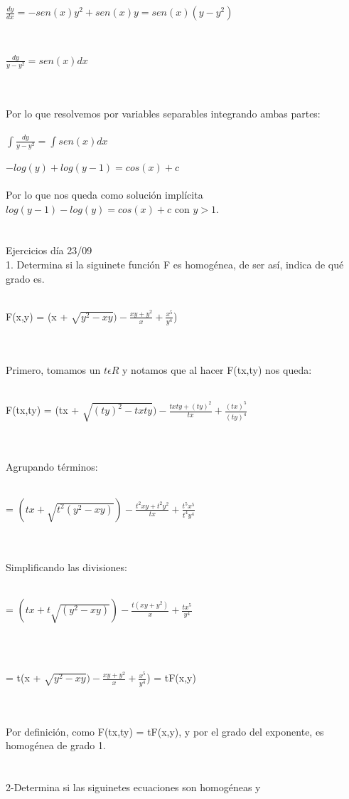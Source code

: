 \documentclass[a4paper,10pt]{article}
\begin{document}
\centerline{$\frac{dy}{dx} = -sen(x)y^2 + sen(x)y = sen(x)(y-y^2)$}\\
\centerline{$\frac{dy}{y-y^2}= sen(x) dx$}\\\\
Por lo que resolvemos por variables separables integrando ambas partes:\\\\
$\int \frac{dy}{y-y^2}= \int sen(x) dx$\\\\
$-log(y) + log(y-1) = cos(x) + c $\\\\
Por lo que nos queda como solución implícita $log(y-1)-log(y)   = cos(x) + c $ con $y>1$.\\\\\\
Ejercicios día 23/09 \\
1. Determina si la siguinete función F es homogénea, de ser así,
indica de qué grado es.\\\\
\centerline{ F(x,y) = (x + $\sqrt{y^2 - xy}) - \frac{xy + y^2 }{x} + \frac{x^5}{y^4}$)}\\\\
Primero, tomamos un $t\epsilon R$ y notamos que al hacer F(tx,ty) nos queda:\\\\
\centerline{ F(tx,ty) = (tx + $\sqrt{(ty)^2 - txty}) - \frac{txty + (ty)^2 }{tx} + \frac{(tx)^5}{(ty)^4}$}\\\\
Agrupando términos:\\\\
\centerline{ = $(tx + \sqrt{t^2(y^2 - xy)}) - \frac{t^2xy + t^2y^2 }{tx} + \frac{t^5x^5}{t^4y^4}$}\\\\
Simplificando las divisiones:\\\\
\centerline{= $(tx + t\sqrt{(y^2 - xy)}) - \frac{t(xy + y^2) }{x} + \frac{tx^5}{y^4}$}\\\\
\centerline{ = t(x + $\sqrt{y^2 - xy}) - \frac{xy + y^2 }{x} + \frac{x^5}{y^4}$) = tF(x,y)}\\\\
Por definición, como F(tx,ty) = tF(x,y), y por el grado del exponente, es homogénea de grado 1.\\\\\\
2-Determina si las siguinetes ecuaciones son homogéneas y
\end{document}
